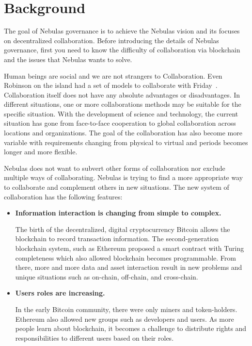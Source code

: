\section{Background}

The goal of Nebulas governance is to achieve the Nebulas vision and its focuses on decentralized collaboration. Before introducing the details of Nebulas governance, first you need to know the difficulty of collaboration via blockchain and the issues that Nebulas wants to solve.

\label{background}

Human beings are social and we are not strangers to Collaboration. Even Robinson on the island had a set of models to collaborate with Friday~\cite{robinson}. Collaboration itself does not have any absolute advantages or disadvantages. In different situations, one or more collaborations methods may be suitable for the specific situation. With the development of science and technology, the current situation has gone from face-to-face cooperation to global collaboration across locations and organizations. The goal of the collaboration has also become more variable with requirements changing from physical to virtual and periods becomes longer and more flexible.

Nebulas does not want to subvert other forms of collaboration nor exclude multiple ways of collaborating. Nebulas is trying to find a more appropriate way to collaborate and complement others in new situations. The new system of collaboration has the following features:

\begin{itemize}
	\item \textbf{Information interaction is changing from simple to complex.}

	The birth of the decentralized, digital cryptocurrency Bitcoin allows the blockchain to record transaction information. The second-generation blockchain system, such as Ethereum proposed a smart contract with Turing completeness which also allowed blockchain becomes programmable. From there, more and more data and asset interaction result in new problems and unique situations such as on-chain, off-chain, and cross-chain.

	\item \textbf{Users roles are increasing.}

	In the early Bitcoin community, there were only miners and token-holders. Ethereum also allowed new groups such as developers and users.  As more people learn about blockchain, it becomes a challenge to distribute rights and responsibilities to different users based on their roles.

\end{itemize}

